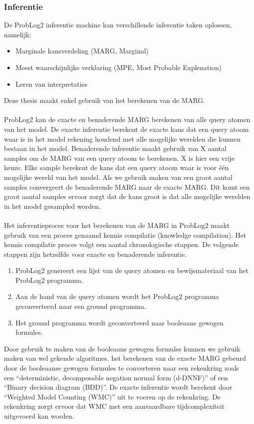 \documentclass[12pt,a4paper,oneside]{book}
\theoremstyle{definition}
\newcommand{\quotes}[1]{``#1''}
\begin{document}
\subsubsection{Inferentie}
\label{subsubsec:inferentieProbLog2}
De ProbLog2 inferentie machine kan verschillende inferentie taken oplossen, namelijk:
\begin{itemize}
	\item Marginale kansverdeling (MARG, Marginal)
	\item Meest waarschijnlijke verklaring (MPE, Most Probable Explenation)
	\item Leren van interpretaties
\end{itemize}
Deze thesis maakt enkel gebruik van het berekenen van de MARG.
\\\\
ProbLog2 kan de exacte en benaderende MARG berekenen van alle query atomen van het model. De exacte inferentie berekent de exacte kans dat een query atoom waar is in het model rekening houdend met alle mogelijke werelden die kunnen bestaan in het model. Benaderende inferentie maakt gebruik van X aantal samples om de MARG van een query atoom te berekenen. X is hier een vrije keuze. Elke sample berekent de kans dat een query atoom waar is voor \'{e}\'{e}n mogelijke wereld van het model. Als we gebruik maken van een groot aantal samples convergeert de benaderende MARG naar de exacte MARG. Dit komt een groot aantal samples ervoor zorgt dat de kans groot is dat alle mogelijke werelden in het model gesampled worden.
\\\\
Het inferentieproces voor het berekenen van de MARG in ProbLog2 maakt gebruik van een proces genaamd kennis compilatie (knowledge compilation). Het kennis compilatie proces volgt een aantal chronologische stappen. De volgende stappen zijn hetzelfde voor exacte en benaderende inferentie.
\begin{enumerate}
	\item ProbLog2 genereert een lijst van de query atomen en bewijsmateriaal van het ProbLog2 programma.
	\item Aan de hand van de query atomen wordt het ProbLog2 programma geconverteerd naar een ground programma.
	\item Het ground programma wordt geconverteerd naar booleaans gewogen formules.
\end{enumerate}
Door gebruik te maken van de booleaans gewogen formules kunnen we gebruik maken van wel gekende algoritmes. het berekenen van de exacte MARG gebeurd door de booleaanse gewogen formules te converteren naar een rekenkring zoals een \quotes{deterministic, decomposable negation normal form (d-DNNF)} of een \quotes{Binary decision diagram (BDD)}. De exacte inferentie wordt berekent door \quotes{Weighted Model Counting (WMC)} uit te voeren op de rekenkring. De rekenkring zorgt ervoor dat WMC met een aanvaardbare tijdcomplexiteit uitgevoerd kan worden.
\end{document}
